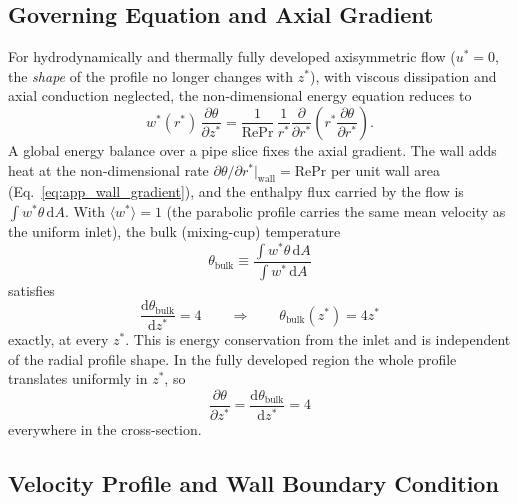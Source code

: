 \documentclass[12pt,a4paper]{article}
\newcommand{\parder}[2]{\frac{\partial #1}{\partial #2}}
\newcommand{\Rey}{\text{Re}}
\newcommand{\Pran}{\text{Pr}}
\begin{document}
\subsection{Governing Equation and Axial Gradient}

For hydrodynamically and thermally fully developed axisymmetric flow ($u^*=0$, the \emph{shape}
of the profile no longer changes with $z^*$), with viscous dissipation and axial conduction
neglected, the non-dimensional energy equation reduces to
\begin{equation}
    w^*(r^*)\,\parder{\theta}{z^*}
      =
      \frac{1}{\Rey\Pran}\,
      \frac{1}{r^*}\parder{}{r^*}
      \left(r^*\parder{\theta}{r^*}\right).
    \label{eq:app_fd_energy}
\end{equation}
A global energy balance over a pipe slice fixes the axial gradient. The wall adds heat at the
non-dimensional rate $\partial\theta/\partial r^*|_{\text{wall}}=\Rey\Pran$ per unit wall area
(Eq.~\eqref{eq:app_wall_gradient}), and the enthalpy flux carried by the flow is
$\int w^*\theta\,\mathrm{d}A$. With $\langle w^*\rangle=1$ (the parabolic profile carries the same
mean velocity as the uniform inlet), the bulk (mixing-cup) temperature
\begin{equation}
    \theta_{\text{bulk}} \equiv
    \frac{\int w^*\theta\,\mathrm{d}A}{\int w^*\,\mathrm{d}A}
\end{equation}
satisfies
\begin{equation}
    \frac{\mathrm{d}\theta_{\text{bulk}}}{\mathrm{d}z^*} = 4
    \qquad\Longrightarrow\qquad
    \theta_{\text{bulk}}(z^*) = 4z^*
    \label{eq:app_bulk}
\end{equation}
exactly, at every $z^*$. This is energy conservation from the inlet and is independent of the
radial profile shape. In the fully developed region the whole profile translates uniformly in
$z^*$, so
\begin{equation}
    \parder{\theta}{z^*} = \frac{\mathrm{d}\theta_{\text{bulk}}}{\mathrm{d}z^*} = 4
\end{equation}
everywhere in the cross-section.

\subsection{Velocity Profile and Wall Boundary Condition}
\end{document}
